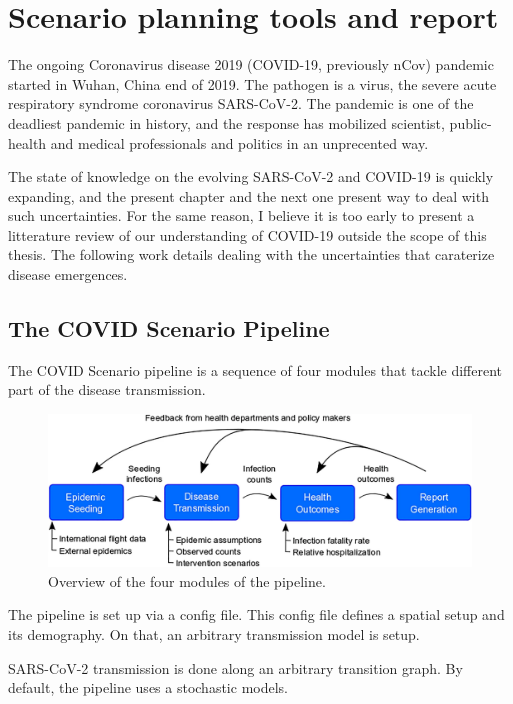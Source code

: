 \chapter{Scenario planning tools and report}
\label{sec:covid-pipeline-reports}

The ongoing Coronavirus disease 2019 (COVID-19, previously nCov) pandemic started in Wuhan, China end of 2019. The pathogen is a virus, the severe acute respiratory syndrome coronavirus SARS-CoV-2. The pandemic is one of the deadliest pandemic in history, and the response has mobilized scientist, public-health and medical professionals and politics in an unprecented way.

The state of knowledge on the evolving SARS-CoV-2 and COVID-19 is quickly expanding, and the present chapter and the next one present way to deal with such uncertainties. For the same reason, I believe it is too early to present a litterature review of our understanding of COVID-19 outside the scope of this thesis. The following work details dealing with the uncertainties that caraterize disease emergences.




\section{The COVID Scenario Pipeline}

The COVID Scenario pipeline is a sequence of four modules that tackle different part of the disease transmission.

\begin{figure}[!htb]
    \centering
    \includegraphics[width = .7\textwidth]{fig_pipeline/fig1a}
    \caption[The four modules of the pipeline]{Overview of the four modules of the pipeline.}
    \label{fig:pipeline-modules}
\end{figure}

The pipeline is set up via a config file. This config file defines a spatial setup and its demography. On that, an arbitrary transmission model is setup.

SARS-CoV-2 transmission is done along an arbitrary transition graph. By default, the pipeline uses a stochastic models.


